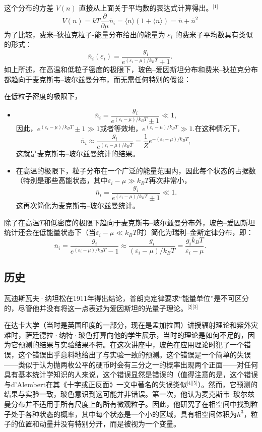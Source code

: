 这个分布的方差 \( V(n) \) 直接从上面关于平均数的表达式计算得出。\(^\text{[1]}\)
\[
V(n) = kT \frac{\partial}{\partial \mu} \bar{n}_i = \langle n \rangle (1 + \langle n \rangle) = \bar{n} + \bar{n}^2~
\]
为了比较，费米–狄拉克粒子-能量分布给出的能量为 \( \varepsilon_i \) 的费米子平均数具有类似的形式：
\[
\bar{n}_i(\varepsilon_i) = \frac{g_i}{e^{(\varepsilon_i - \mu) / k_B T} + 1}.~
\]
如上所述，在高温和低粒子密度的极限下，玻色–爱因斯坦分布和费米–狄拉克分布都趋向于麦克斯韦–玻尔兹曼分布，而无需任何特别的假设：

在低粒子密度的极限下，
\begin{itemize}
\item 
\[
\bar{n}_i = \frac{g_i}{e^{(\varepsilon_i - \mu) / k_B T} \pm 1} \ll 1,~
\]
因此，\(e^{(\varepsilon_i - \mu) / k_B T} \pm 1 \gg 1\)或者等效地，\(e^{(\varepsilon_i - \mu) / k_B T} \gg 1\).在这种情况下，
\[
\bar{n}_i \approx \frac{g_i}{e^{(\varepsilon_i - \mu) / k_B T}} = \frac{1}{Z} e^{-(\varepsilon_i - \mu) / k_B T},~
\]
这就是麦克斯韦–玻尔兹曼统计的结果。
\item 在高温的极限下，粒子分布在一个广泛的能量范围内，因此每个状态的占据数（特别是那些高能状态，其中\( \varepsilon_i - \mu \gg k_B T \)再次非常小，
\[
\bar{n}_i = \frac{g_i}{e^{(\varepsilon_i - \mu) / k_B T} \pm 1} \ll 1.~
\]
这再次简化为麦克斯韦–玻尔兹曼统计。
\end{itemize}
除了在高温\( T \)和低密度的极限下趋向于麦克斯韦–玻尔兹曼分布外，玻色–爱因斯坦统计还会在低能量状态下（当\(\varepsilon_i - \mu \ll k_B T\)时）简化为瑞利–金斯定律分布，即：
\[
\bar{n}_i = \frac{g_i}{e^{(\varepsilon_i - \mu) / k_B T} - 1} \approx \frac{g_i}{(\varepsilon_i - \mu) / k_B T} = \frac{g_i k_B T}{\varepsilon_i - \mu}.~
\]
\subsection{历史} 
瓦迪斯瓦夫·纳坦松在1911年得出结论，普朗克定律要求“能量单位”是不可区分的，尽管他并没有将这一点表述为爱因斯坦的光量子理论。\(^\text{[2][3]}\)

在达卡大学（当时是英国印度的一部分，现在是孟加拉国）讲授辐射理论和紫外灾难时，萨廷德拉·纳特·玻色打算向他的学生展示，当时的理论是如何不足的，因为它预测的结果与实验结果不符。在这次讲座中，玻色在应用理论时犯了一个错误，这个错误出乎意料地给出了与实验一致的预测。这个错误是一个简单的失误——类似于认为抛两枚公平的硬币时会有三分之一的概率出现两个正面——对任何具有基本统计学知识的人来说，这个错误显然是错误的（值得注意的是，这个错误与d'Alembert在其《十字或正反面》一文中著名的失误类似\(^\text{[4][5]}\)）。然而，它预测的结果与实验一致，玻色意识到这可能并非错误。第一次，他认为麦克斯韦–玻尔兹曼分布并不适用于所有尺度上的所有微观粒子。因此，他研究了在相空间中找到粒子处于各种状态的概率，其中每个状态是一个小的区域，具有相空间体积为\( h^3 \)，粒子的位置和动量并没有特别分开，而是被视为一个变量。

